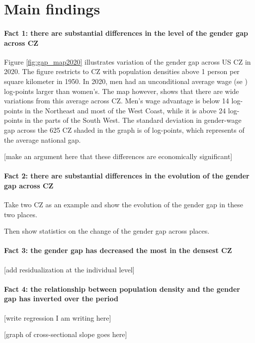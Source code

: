 \section{Main findings}
\paragraph{Fact 1: there are substantial differences in the \alert{level} of the gender gap across CZ}


Figure \ref{fig:gap_map2020} illustrates variation of the gender gap across US CZ in 2020. The figure restricts to CZ with population densities above 1 person per square kilometer in 1950. In 2020, men had an unconditional average wage  (se )
 log-points larger than women's. The map however, shows that there are wide variations from this average across CZ. Men's wage advantage is below 14 log-points in the Northeast and most of the West Coast, while it is above 24 log-points in the parts of the South West. The standard deviation in gender-wage gap across the 625 CZ shaded in the graph is of log-points, which represents of the average national gap.
 
 [make an argument here that these differences are economically significant]
 
 
 





\paragraph{Fact 2: there are substantial differences in the \alert{evolution} of the gender gap across CZ}

\bitem	
	\item Take two CZ as an example and show the evolution of the gender gap in these two places.
	\item Then show statistics on the change of the gender gap across places.
\eitem 
\paragraph{Fact 3: the gender gap has decreased the most in the densest CZ}
	
	
	
	[add residualization at the individual level]

\paragraph{Fact 4: the relationship between population density and the gender gap has inverted over the period}

[write regression I am writing here]

[graph of cross-sectional slope goes here]

